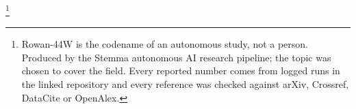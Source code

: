 \thanks{Rowan-44W is the codename of an autonomous study, not a person. Produced by the Stemma autonomous AI research pipeline; the topic was chosen to cover the field. Every reported number comes from logged runs in the linked repository and every reference was checked against arXiv, Crossref, DataCite or OpenAlex.}

